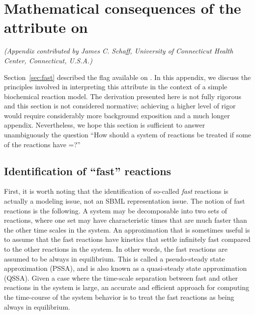 
\section{Mathematical consequences of the  attribute on
  }
\label{apdx:consequences-of-being-fast}

\emph{(Appendix contributed by James C. Schaff, University of
  Connecticut Health Center, Connecticut, U.S.A.)}

Section~\ref{sec:fast} described the  flag available
on \Reaction.  In this appendix, we discuss the principles
involved in interpreting this attribute in the context of a simple
biochemical reaction model.  The derivation presented here is not
fully rigorous and this section is not considered normative;
achieving a higher level of rigor would require considerably more
background exposition and a much longer appendix.  Nevertheless,
we hope this section is sufficient to answer unambiguously the
question ``How should a system of reactions be treated if some of
the reactions have =?''


\subsection*{Identification of ``fast'' reactions}

First, it is worth noting that the identification of so-called
\emph{fast} reactions is actually a modeling issue, not an SBML
representation issue.  The notion of fast reactions is the
following.  A system may be decomposable into two sets of
reactions, where one set may have characteristic times that are
much faster than the other time scales in the system.  An
approximation that is sometimes useful is to assume that the fast
reactions have kinetics that settle infinitely fast compared to
the other reactions in the system.  In other words, the fast
reactions are assumed to be always in equilibrium.  This is called
a pseudo-steady state approximation (PSSA), and is also known as a
quasi-steady state approximation (QSSA).  Given a case where the
time-scale separation between fast and other reactions in the
system is large, an accurate and efficient approach for computing
the time-course of the system behavior is to treat the fast
reactions as being always in equilibrium.

